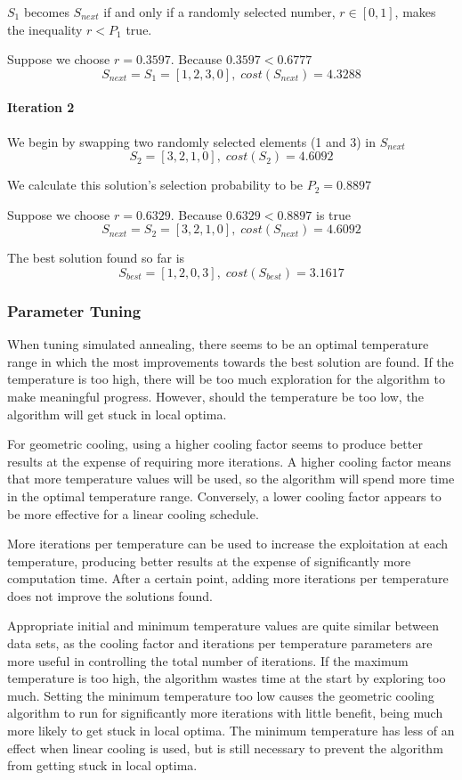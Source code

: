 \documentclass[a4paper]{article}
\newcommand{\subsubsubsection}[1]{\paragraph{#1} \mbox{}}
\begin{document}
$S_1$ becomes $S_\mathit{next}$ if and only if a randomly selected number,
$r \in [0, 1]$, makes the inequality $r < P_1$ true.

Suppose we choose $r = 0.3597$. Because $0.3597 < 0.6777$
$$S_\mathit{next} = S_1 = [ 1, 2, 3, 0 ], \; \mathit{cost}(S_\mathit{next}) = 4.3288$$

\subsubsubsection{Iteration 2}

We begin by swapping two randomly selected elements (1 and 3) in $S_\mathit{next}$
$$S_2 = [ 3, 2, 1, 0 ], \; \mathit{cost}(S_2) = 4.6092$$

We calculate this solution's selection probability to be $P_2 = 0.8897$

Suppose we choose $r = 0.6329$. Because $0.6329 < 0.8897$ is true
$$S_\mathit{next} = S_2 = [ 3, 2, 1, 0 ], \; \mathit{cost}(S_\mathit{next}) = 4.6092$$

The best solution found so far is
$$S_\mathit{best} = [ 1, 2, 0, 3 ], \; \mathit{cost}(S_\mathit{best}) = 3.1617$$

\subsubsection{Parameter Tuning}

When tuning simulated annealing, there seems to be an optimal temperature range in which the most improvements towards the best solution are found. If the temperature is too high, there will be too much exploration for the algorithm to make meaningful progress. However, should the temperature be too low, the algorithm will get stuck in local optima.

For geometric cooling, using a higher cooling factor seems to produce better results at the expense of requiring more iterations. A higher cooling factor means that more temperature values will be used, so the algorithm will spend more time in the optimal temperature range. Conversely, a lower cooling factor appears to be more effective for a linear cooling schedule.

More iterations per temperature can be used to increase the exploitation at each temperature, producing better results at the expense of significantly more computation time. After a certain point, adding more iterations per temperature does not improve the solutions found.

Appropriate initial and minimum temperature values are quite similar between data sets, as the cooling factor and iterations per temperature parameters are more useful in controlling the total number of iterations. If the maximum temperature is too high, the algorithm wastes time at the start by exploring too much. Setting the minimum temperature too low causes the geometric cooling algorithm to run for significantly more iterations with little benefit, being much more likely to get stuck in local optima. The minimum temperature has less of an effect when linear cooling is used, but is still necessary to prevent the algorithm from getting stuck in local optima.
\end{document}
